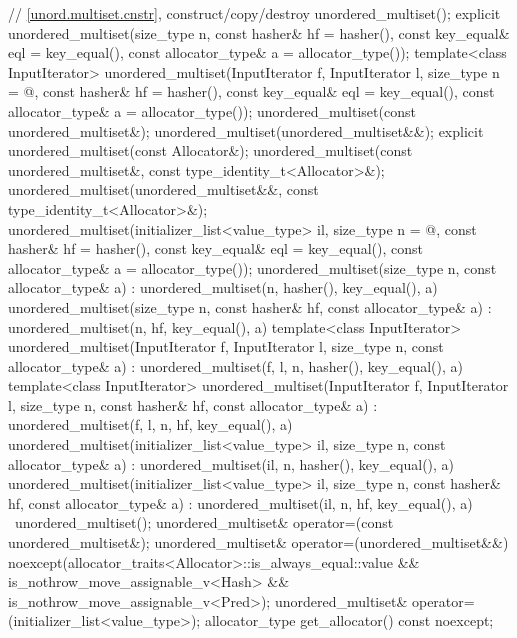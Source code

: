 \begin{codeblock}
{{    // \ref{unord.multiset.cnstr}, construct/copy/destroy
    unordered_multiset();
    explicit unordered_multiset(size_type n,
                                const hasher& hf = hasher(),
                                const key_equal& eql = key_equal(),
                                const allocator_type& a = allocator_type());
    template<class InputIterator>
      unordered_multiset(InputIterator f, InputIterator l,
                         size_type n = @\seebelow@,
                         const hasher& hf = hasher(),
                         const key_equal& eql = key_equal(),
                         const allocator_type& a = allocator_type());
    unordered_multiset(const unordered_multiset&);
    unordered_multiset(unordered_multiset&&);
    explicit unordered_multiset(const Allocator&);
    unordered_multiset(const unordered_multiset&, const type_identity_t<Allocator>&);
    unordered_multiset(unordered_multiset&&, const type_identity_t<Allocator>&);
    unordered_multiset(initializer_list<value_type> il,
                       size_type n = @\seebelow@,
                       const hasher& hf = hasher(),
                       const key_equal& eql = key_equal(),
                       const allocator_type& a = allocator_type());
    unordered_multiset(size_type n, const allocator_type& a)
      : unordered_multiset(n, hasher(), key_equal(), a) { }
    unordered_multiset(size_type n, const hasher& hf, const allocator_type& a)
      : unordered_multiset(n, hf, key_equal(), a) { }
    template<class InputIterator>
      unordered_multiset(InputIterator f, InputIterator l, size_type n, const allocator_type& a)
        : unordered_multiset(f, l, n, hasher(), key_equal(), a) { }
    template<class InputIterator>
      unordered_multiset(InputIterator f, InputIterator l, size_type n, const hasher& hf,
                         const allocator_type& a)
      : unordered_multiset(f, l, n, hf, key_equal(), a) { }
    unordered_multiset(initializer_list<value_type> il, size_type n, const allocator_type& a)
      : unordered_multiset(il, n, hasher(), key_equal(), a) { }
    unordered_multiset(initializer_list<value_type> il, size_type n, const hasher& hf,
                       const allocator_type& a)
      : unordered_multiset(il, n, hf, key_equal(), a) { }
    ~unordered_multiset();
    unordered_multiset& operator=(const unordered_multiset&);
    unordered_multiset& operator=(unordered_multiset&&)
      noexcept(allocator_traits<Allocator>::is_always_equal::value &&
               is_nothrow_move_assignable_v<Hash> &&
               is_nothrow_move_assignable_v<Pred>);
    unordered_multiset& operator=(initializer_list<value_type>);
    allocator_type get_allocator() const noexcept;

}}
\end{codeblock}
